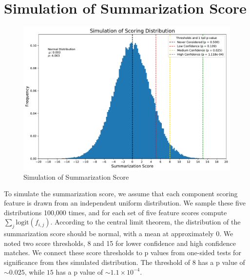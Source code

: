 \section{Simulation of Summarization Score}

\begin{figure}
    \caption{Simulation of Summarization Score\label{fig:simulation_of_score}}
    \includegraphics[width=.95\linewidth]{figure/simulation_of_scoring_distribution.pdf}
\end{figure}

To simulate the summarization score, we assume that each component scoring feature is
drawn from an independent uniform distribution. We sample these five distributions
100,000 times, and for each set of five feature scores compute $\sum_j\text{logit}(f_{i, j})$.
According to the central limit theorem, the distribution of the summarization score should be
normal, with a mean at approximately 0. We noted two score thresholds, 8 and 15 for lower
confidence and high confidence matches. We connect these score thresholds to p values from
one-sided tests for significance from thes simulated distribution. The threshold of $8$ has
a p value of $\sim0.025$, while $15$ has a p value of $\sim1.1\times10^{-4}$.